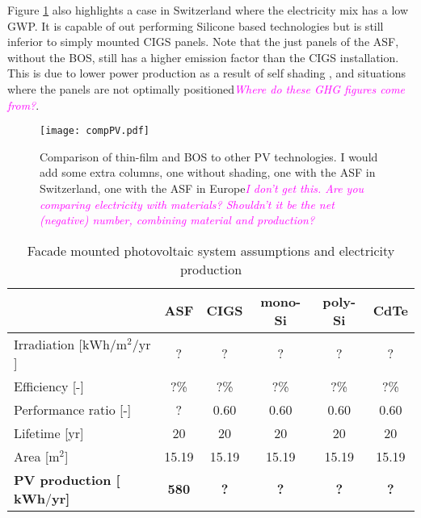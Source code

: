 Figure \ref{fig:compPV} also highlights a case in Switzerland where the electricity mix has a low GWP. It is capable of out performing Silicone based technologies but is still inferior to simply mounted CIGS panels. Note that the just panels of the ASF, without the BOS, still has a higher emission factor than the CIGS installation. This is due to lower power production as a result of self shading \cite{hofer2015photovoltaics}, and situations where the panels are not optimally positioned\textcolor{magenta}{\textit{Where do these GHG figures come from?}}.

\begin{figure}[H]
\begin{center}
\texttt{[image: compPV.pdf]}
\caption{Comparison of thin-film and BOS to other PV technologies. I would add some extra columns, one without shading, one with the ASF in Switzerland, one with the ASF in Europe\textcolor{magenta}{\textit{I don't get this. Are you comparing electricity with materials? Shouldn't it be the net (negative) number, combining material and production?}}}
\label{fig:compPV}
\end{center}
\end{figure}

\begin{table}[H]
\begin{tabular}{@{}lccccc@{}}\hline
&\textbf{ASF}&\textbf{CIGS}	& \textbf{mono-Si} 	& \textbf{poly-Si} & \textbf{CdTe}	\\ \hline
Irradiation [${\mathrm{kWh/m^2/yr}}$]& ? & ?	& ? & ? & ? \\
Efficiency [-]						& ?\% & ?\%	& ?\%	& ?\%	& ?\%	\\
Performance ratio [-] 				& ? & 0.60	& 0.60	& 0.60 	& 0.60\\
Lifetime	 [yr]						& 20 & 20 	& 20 	& 20 	& 20\\
Area	 [${\mathrm{m^2}}$]				& 15.19 & 15.19 & 15.19	& 15.19	& 15.19 	\\
\hline
\textbf{PV production [${\mathbf{kWh/yr}}$]	} 		& \textbf{580} &\textbf{?}&\textbf{?}&\textbf{?}&\textbf{?}		\\
\hline
\end{tabular}
\caption{Facade mounted photovoltaic system assumptions and electricity production}
\label{pvoverview}
\end{table}





